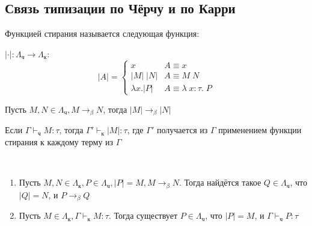 \subsection{Связь типизации по Чёрчу и по Карри}

\begin{definition}[Стирание] Функцией стирания называется следующая функция: 
	
$|\cdot| : \Lambda_{\text{ч}} \to \Lambda_{\text{к}}$:
	\[
	|{A}| =
	\begin{cases}
	x                                   & A \equiv x \\
	|M| \; |N| & A \equiv M \; N \\
	\lambda x . |P|           & A \equiv \lambda \; x : \tau. \; P
	\end{cases}
	\]
\end{definition}

\begin{lemma}
	Пусть $M, N \in \Lambda_{\text{ч}}, M \to_\beta N$, тогда $|M| \to_\beta |N|$
\end{lemma}

\begin{lemma}
	Если $\Gamma \vdash_{\text{ч}} M : \tau$, тогда $\Gamma' \vdash_{\text{к}} |M| : \tau$, где $\Gamma'$ получается из $\Gamma$ применением функции стирания к каждому терму из $\Gamma$
\end{lemma}

\begin{theorem} \ 
	\begin{enumerate}
		\item Пусть $M, N \in \Lambda_{\text{к}}, P \in \Lambda_{\text{ч}}, |P| = M, M \to_\beta N$. Тогда найдётся такое $Q \in \Lambda_{\text{ч}}$, что $|Q| = N$, и $P \to_\beta Q$
		\item Пусть $M \in \Lambda_{\text{к}}, \Gamma \vdash_{\text{к}} M : \tau$. Тогда существует $P \in \Lambda_{\text{ч}}$, что $|P| = M$, и $\Gamma \vdash_{\text{ч}} P : \tau$
	\end{enumerate}
\end{theorem}